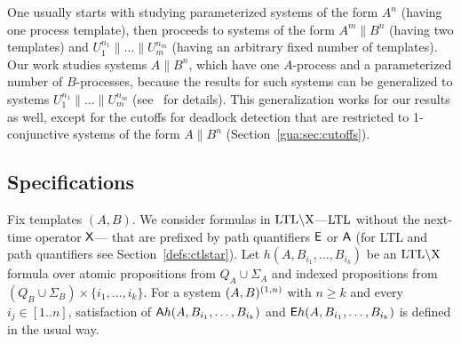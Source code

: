 \begin{remark}[$A^m {\parallel} B^n$]
One usually starts with studying parameterized systems of the form $A^n$ (having one process template),
then proceeds to systems of the form $A^m {\parallel} B^n$ (having two templates)
and $U_1^{n_1} {\parallel} \ldots {\parallel} U_m^{n_m}$ (having an arbitrary fixed number of templates).
Our work studies systems $A {\parallel} B^n$,
which have one $A$-process and a parameterized number of $B$-processes,
because the results for such systems can be generalized to systems $U_1^{n_1} {\parallel} \ldots {\parallel} U_m^{n_m}$
(see~\cite{Emerson00} for details).
This generalization works for our results as well,
except for the cutoffs for deadlock detection that are restricted to 1-conjunctive systems of the form $A\parallel B^n$
(Section~\ref{gua:sec:cutoffs}).
\end{remark}

\subsection{Specifications}
\label{gua:sec:semantics}
Fix templates $(A,B)$.
We consider formulas in $\text{LTL}\backslash\text{X}$---$\text{LTL}$ without the next-time operator $\operatorname{\mathsf{X}}$---%
that are prefixed by path quantifiers ${\operatorname{\mathsf{E}}}$ or ${\operatorname{\mathsf{A}}}$
(for LTL and path quantifiers see Section~\ref{defs:ctlstar}).
Let $h(A,B_{i_1},\ldots,B_{i_k})$ be an $\text{LTL}\backslash\text{X}$ formula over atomic propositions from $Q_A \cup \Sigma_A$ and indexed propositions from $(Q_B \cup \Sigma_B) \times \{i_1,\ldots,i_k\}$.
For a system $(A,B)^{(1,n)}$ with $n \geq k$ and every $i_j \in [1..n]$,
satisfaction of ${\operatorname{\mathsf{A}}} h(A,B_{i_1},\ldots,B_{i_k})$ and ${\operatorname{\mathsf{E}}} h(A,B_{i_1},\ldots,B_{i_k})$ is defined in the usual way.


